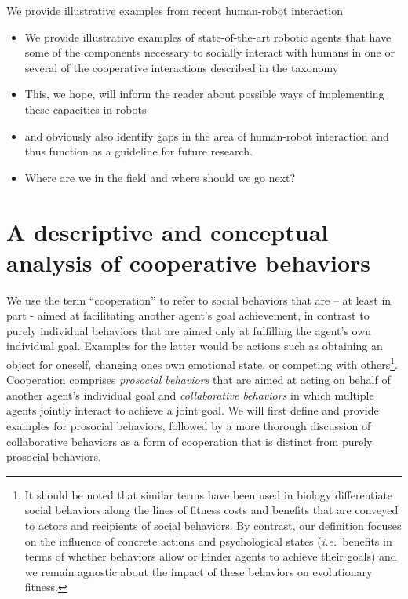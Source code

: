 \documentclass{article}
\newcommand{\ie}{{\textit{i.e.~}}}
\begin{document}
We provide illustrative examples from recent human-robot interaction

\begin{itemize}

\item We provide illustrative examples of state-of-the-art robotic agents that
have some of the components necessary to socially interact with humans in one
or several of the cooperative interactions described in the taxonomy

\item This, we hope, will inform the reader about possible ways of implementing
these capacities in robots

\item and obviously also identify gaps in the area of human-robot interaction
and thus function as a guideline for future research.

\item Where are we in the field and where should we go next?

\end{itemize}

\section{A descriptive and conceptual analysis of cooperative behaviors}

We use the term ``cooperation{}'' to refer to social behaviors that are -- at
least in part {}-  aimed at facilitating another agent{}'s goal achievement, in
contrast to purely individual behaviors that are aimed only at fulfilling the
agent{}'s own individual goal. Examples for the latter would be actions such as
obtaining an object for oneself, changing ones own emotional state, or
competing with others\footnote{ It should be noted that similar terms have been
used in biology differentiate social behaviors along the lines of fitness costs
and benefits that are conveyed to actors and recipients of social behaviors. By
contrast, our definition focuses on the influence of concrete actions and
psychological states (\ie benefits in terms of whether behaviors allow or
hinder agents to achieve their goals) and we remain agnostic about the impact
of these behaviors on evolutionary fitness.\par }. Cooperation comprises
\textit{prosocial behaviors} that are aimed at acting on behalf of another
agent{}'s individual goal and \textit{collaborative behaviors} in which
multiple agents jointly interact to achieve a joint goal. We will first define
and provide examples for prosocial behaviors, followed by a more thorough
discussion of collaborative behaviors as a form of cooperation that is distinct
from purely prosocial behaviors.
\end{document}
